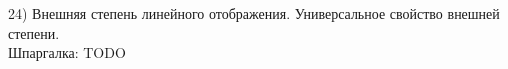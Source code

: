 24) Внешняя степень линейного отображения. Универсальное свойство внешней степени.\\

Шпаргалка: TODO\\
